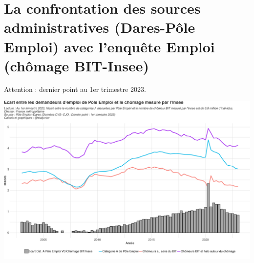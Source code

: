 \documentclass[
  paper=a4,
  ,captions=tableheading
]{scrartcl}
\begin{document}
\newpage

\hypertarget{la-confrontation-des-sources-administratives-dares-puxf4le-emploi-avec-lenquuxeate-emploi-chuxf4mage-bit-insee}{%
\section{La confrontation des sources administratives (Dares-Pôle
Emploi) avec l'enquête Emploi (chômage
BIT-Insee)}\label{la-confrontation-des-sources-administratives-dares-puxf4le-emploi-avec-lenquuxeate-emploi-chuxf4mage-bit-insee}}

Attention : dernier point au 1er trimestre 2023.

\includegraphics{rapport_pdf_demandeurs_emploi_pole_emploi_files/figure-latex/unnamed-chunk-21-1.pdf}
\end{document}
